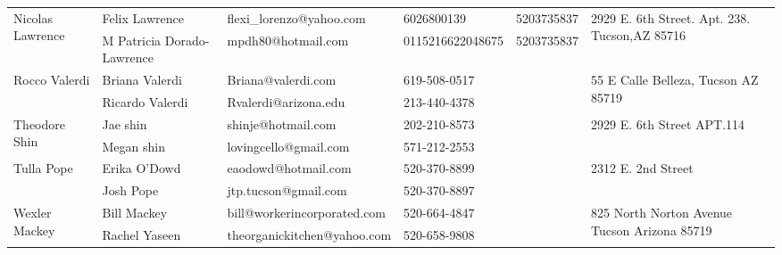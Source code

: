 \documentclass[landscape]{article}\usepackage[]{graphicx}\usepackage[]{color}
\begin{document}
\begin{longtable}{|p{100pt}|p{100pt}|p{140pt}|p{60pt}|p{64pt}|p{120pt}|}
\hline
\multirow{2}{100pt}{Nicolas Lawrence} & Felix Lawrence & flexi\_lorenzo@yahoo.com & 6026800139 & 5203735837 & \multirow{2}{120pt}{2929 E. 6th Street. Apt. 238. Tucson,AZ 85716} \\
 & M Patricia Dorado-Lawrence & mpdh80@hotmail.com & 0115216622048675 & 5203735837 & \\
\hline
\multirow{2}{100pt}{Rocco Valerdi} & Briana Valerdi & Briana@valerdi.com & 619-508-0517 &  & \multirow{2}{120pt}{55 E Calle Belleza, Tucson AZ 85719} \\
 & Ricardo Valerdi & Rvalerdi@arizona.edu & 213-440-4378 &  & \\
\hline
\multirow{2}{100pt}{Theodore Shin} & Jae shin & shinje@hotmail.com & 202-210-8573 &  & \multirow{2}{120pt}{2929 E. 6th Street APT.114} \\
 & Megan shin & lovingcello@gmail.com & 571-212-2553 &  & \\
\hline
\multirow{2}{100pt}{Tulla Pope} & Erika O'Dowd & eaodowd@hotmail.com & 520-370-8899 &  & \multirow{2}{120pt}{2312 E. 2nd Street} \\
 & Josh Pope & jtp.tucson@gmail.com & 520-370-8897 &  & \\
\hline
\multirow{2}{100pt}{Wexler Mackey} & Bill Mackey & bill@workerincorporated.com & 520-664-4847 &  & \multirow{2}{120pt}{825 North Norton Avenue Tucson Arizona 85719} \\
 & Rachel Yaseen & theorganickitchen@yahoo.com & 520-658-9808 &  & \\
\hline
\end{longtable}
\newpage
\end{document}

